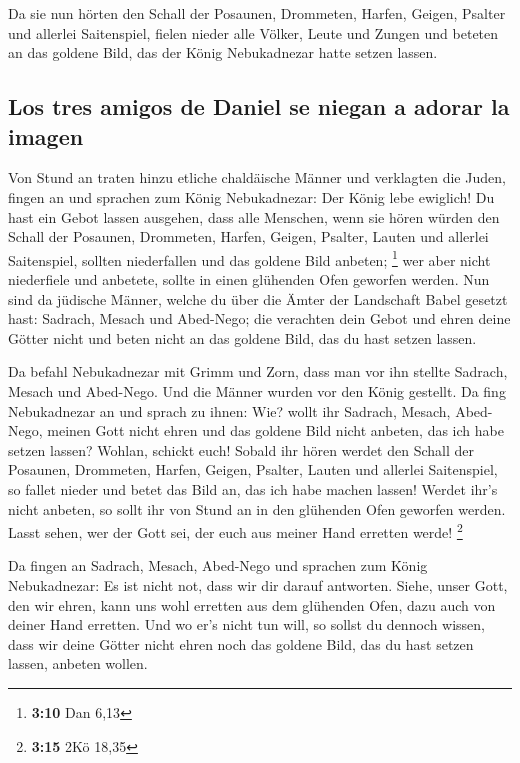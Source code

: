  Da sie nun hörten den Schall der Posaunen, Drommeten,
Harfen, Geigen, Psalter und allerlei Saitenspiel, fielen nieder alle
Völker, Leute und Zungen und beteten an das goldene Bild, das der König
Nebukadnezar hatte setzen lassen.

\hypertarget{los-tres-amigos-de-daniel-se-niegan-a-adorar-la-imagen}{%
\subsection{Los tres amigos de Daniel se niegan a adorar la
imagen}\label{los-tres-amigos-de-daniel-se-niegan-a-adorar-la-imagen}}

 Von Stund an traten hinzu etliche chaldäische Männer und
verklagten die Juden,  fingen an und sprachen zum König
Nebukadnezar: Der König lebe ewiglich!  Du hast ein Gebot
lassen ausgehen, dass alle Menschen, wenn sie hören würden den Schall
der Posaunen, Drommeten, Harfen, Geigen, Psalter, Lauten und allerlei
Saitenspiel, sollten niederfallen und das goldene Bild anbeten;
\footnote{\textbf{3:10} Dan 6,13}  wer aber nicht
niederfiele und anbetete, sollte in einen glühenden Ofen geworfen
werden.  Nun sind da jüdische Männer, welche du über die
Ämter der Landschaft Babel gesetzt hast: Sadrach, Mesach und Abed-Nego;
die verachten dein Gebot und ehren deine Götter nicht und beten nicht an
das goldene Bild, das du hast setzen lassen.

 Da befahl Nebukadnezar mit Grimm und Zorn, dass man vor
ihn stellte Sadrach, Mesach und Abed-Nego. Und die Männer wurden vor den
König gestellt.  Da fing Nebukadnezar an und sprach zu
ihnen: Wie? wollt ihr Sadrach, Mesach, Abed-Nego, meinen Gott nicht
ehren und das goldene Bild nicht anbeten, das ich habe setzen lassen?
 Wohlan, schickt euch! Sobald ihr hören werdet den Schall
der Posaunen, Drommeten, Harfen, Geigen, Psalter, Lauten und allerlei
Saitenspiel, so fallet nieder und betet das Bild an, das ich habe machen
lassen! Werdet ihr's nicht anbeten, so sollt ihr von Stund an in den
glühenden Ofen geworfen werden. Lasst sehen, wer der Gott sei, der euch
aus meiner Hand erretten werde! \footnote{\textbf{3:15} 2Kö 18,35}

 Da fingen an Sadrach, Mesach, Abed-Nego und sprachen zum
König Nebukadnezar: Es ist nicht not, dass wir dir darauf antworten.
 Siehe, unser Gott, den wir ehren, kann uns wohl erretten
aus dem glühenden Ofen, dazu auch von deiner Hand erretten.
 Und wo er's nicht tun will, so sollst du dennoch wissen,
dass wir deine Götter nicht ehren noch das goldene Bild, das du hast
setzen lassen, anbeten wollen.

